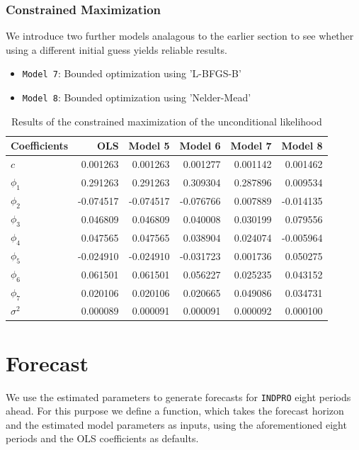 \documentclass{article}
\begin{document}
\subsubsection{Constrained Maximization}
We introduce two further models analagous to the earlier section to see whether using a different initial guess yields reliable results.
\begin{itemize}
\item \texttt{Model 7}: Bounded optimization using 'L-BFGS-B'
\item \texttt{Model 8}: Bounded optimization using 'Nelder-Mead'
\end{itemize}

\begin{table}[h]
\centering
\caption{Results of the constrained maximization of the unconditional likelihood}
\begin{tabular}{lrrrrr}
\toprule
Coefficients & OLS & Model 5 & Model 6 & Model 7 & Model 8 \\
\midrule
$c$ & 0.001263 & 0.001263 & 0.001277 & 0.001142 & 0.001462 \\
$\phi_1$ & 0.291263 & 0.291263 & 0.309304 & 0.287896 & 0.009534 \\
$\phi_2$ & -0.074517 & -0.074517 & -0.076766 & 0.007889 & -0.014135 \\
$\phi_3$ & 0.046809 & 0.046809 & 0.040008 & 0.030199 & 0.079556 \\
$\phi_4$ & 0.047565 & 0.047565 & 0.038904 & 0.024074 & -0.005964 \\
$\phi_5$ & -0.024910 & -0.024910 & -0.031723 & 0.001736 & 0.050275 \\
$\phi_6$ & 0.061501 & 0.061501 & 0.056227 & 0.025235 & 0.043152 \\
$\phi_7$ & 0.020106 & 0.020106 & 0.020665 & 0.049086 & 0.034731 \\
$\sigma^2$ & 0.000089 & 0.000091 & 0.000091 & 0.000092 & 0.000100 \\
\bottomrule
\end{tabular}
\end{table}

\section{Forecast}
We use the estimated parameters to generate forecasts for \texttt{INDPRO} eight periods ahead.
For this purpose we define a function, which takes the forecast horizon and the estimated model parameters as inputs, using the aforementioned eight periods and the OLS coefficients as defaults.
\end{document}

